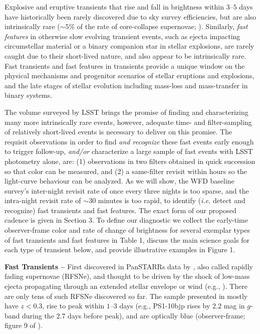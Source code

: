 \documentclass[11pt]{article}
\begin{document}

Explosive and eruptive transients that rise and fall in brightness within $3$--$5$ days have historically been rarely discovered due to sky survey efficiencies, but are also intrinsically rare ($\sim 5\%$ of the rate of core-collapse supernovae; \citealt{2014ApJ...794...23D}). Similarly, {\it fast features} in otherwise slow evolving transient events, such as ejecta impacting circumstellar material or a binary companion star in stellar explosions, are rarely caught due to their short-lived nature, and also appear to be intrinsically rare. Fast transients and fast features in transients provide a unique window on the physical mechanisms and progenitor scenarios of stellar eruptions and explosions, and the late stages of stellar evolution including mass-loss and mass-transfer in binary systems.

The volume surveyed by LSST brings the promise of finding and characterizing many more intrinsically rare events, however, adequate time- and filter-sampling of relatively short-lived events is necessary to deliver on this promise. The requisit observations in order to find \emph{and recognize} these fast events early enough to trigger follow-up, {\it and/or} characterize a large sample of fast events with LSST photometry alone, are: (1) observations in two filters obtained in quick succession so that color can be measured, and (2) a same-filter revisit within hours so the light-curve behaviour can be analyzed. As we will show, the WFD baseline survey's inter-night revisit rate of once every three nights is too sparse, and the intra-night revisit rate of $\sim30$ minutes is too rapid, to identify (\emph{i.e.} detect and recognize) fast transients and fast features. The exact form of our proposed cadence is given in Section 3. To define our diagnostic we collect the early-time observer-frame color and rate of change of brightness for several exemplar types of fast transients and fast features in Table 1, discuss the main science goals for each type of transient below, and provide illustrative examples in Figure 1.

{\bf Fast Transients --} First discovered in PanSTARRs data by \cite{2014ApJ...794...23D}, also called rapidly fading supernovae (RFSNe), and thought to be driven by the shock of low-mass ejecta propagating through an extended stellar envelope or wind (e.g., \citealt{2018MNRAS.475.3152K}). There are only tens of such RFSNe discovered so far. The sample presented in \cite{2014ApJ...794...23D} mostly have $z<0.3$, rise to peak within $1$--$3$ days (e.g., PS1-10bjp rises by $2.2$ mag in $g$-band during the $2.7$ days before peak), and are optically blue (observer-frame; figure 9 of \citealt{2014ApJ...794...23D}).
\end{document}
